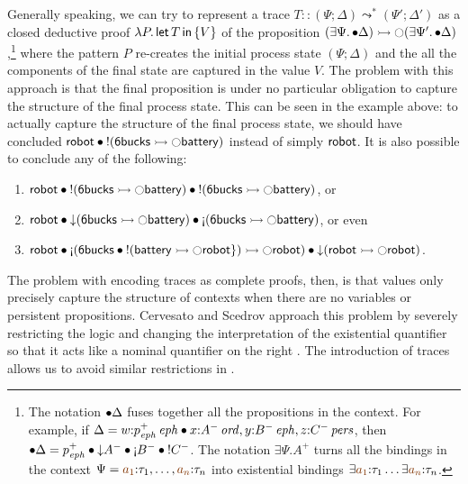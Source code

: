 Generally speaking, we can try to represent a trace $T :: (\Psi;
\Delta) \leadsto^* (\Psi'; \Delta')$ as a closed deductive proof
$\lambda P.\,{\sf let}\,{T}\,{\sf in}\,\{ {V} \}$ of the proposition $(\exists
\Psi.\,{\mathbin{\bullet}}\Delta) \rightarrowtail {\ocircle}(\exists
\Psi'.\,{\mathbin{\bullet}}\Delta)$,\footnote{The notation ${\mathbin{\bullet}}{\Delta}$ fuses
  together all the propositions in the context. For example, if
  $\Delta = w{:}{p^+_{\it eph}}\,{{\it eph}} \mathbin{\bullet} x{:}{A^-}\,{{\it ord}},
  y{:}{B^-}\,{{\it eph}}, z{:}{C^-}\,{{\it pers}}$, then ${\fuse}{\Delta} = p^+_\meph
  \fuse {\downarrow}A^- \fuse {\gnab}B^- \fuse {!}C^-$. The notation
  $\exists \Psi. A^+$ turns all the bindings in the context $\Psi =
  \lf{a_1}{:}\tau_1,\ldots,\lf{a_n}{:}\tau_n$ into existential
  bindings $\exists \lf{a_1}{:}\tau_1\ldots\exists
  \lf{a_n}{:}\tau_n$.}  where the pattern $P$ re-creates the initial
process state $(\Psi; \Delta)$ and the all the components of the final
state are captured in the value $V$.  The problem with this approach
is that the final proposition is under no particular obligation to
capture the structure of the final process state. This can be seen in
the example above: to actually capture the structure of the final
process state, we should have concluded ${\sf robot} \mathbin{\bullet} {!}({\sf
  6bucks} \rightarrowtail {\ocircle}{\sf battery})$ instead of simply ${\sf
  robot}$. It is also possible to conclude any of the following:
\smallskip
\begin{enumerate}
\item ${\sf robot} \mathbin{\bullet} {!}({\sf 6bucks} \rightarrowtail {\ocircle}{\sf
  battery}) \mathbin{\bullet} {!}({\sf 6bucks} \rightarrowtail {\ocircle}{\sf
  battery})$, or 
\item ${\sf robot} \fuse {\downarrow}({\sf 6bucks} \lefti {\ocircle}{\sf
  battery}) \fuse {\gnab}({\sf 6bucks} \lefti {\ocircle}{\sf
  battery})$, or even
\item ${\sf robot}  \fuse {\gnab}({\sf 6bucks} \fuse {!}({\sf battery} \lefti {\ocircle}{\sf robot} \}) \lefti {\ocircle}{\sf robot})
  \fuse {\downarrow}({\sf robot}
\lefti {\ocircle}{\sf robot})$.
\end{enumerate}
\smallskip 
%
The problem with encoding traces as complete proofs, then, is that
values only precisely capture the structure of contexts when there are
no variables or persistent propositions. Cervesato and Scedrov
approach this problem by severely restricting the logic and changing
the interpretation of the existential quantifier so that it acts like
a nominal quantifier on the right \cite{cervesato09relating}. The
introduction of traces allows us to avoid similar restrictions in
\sls.

